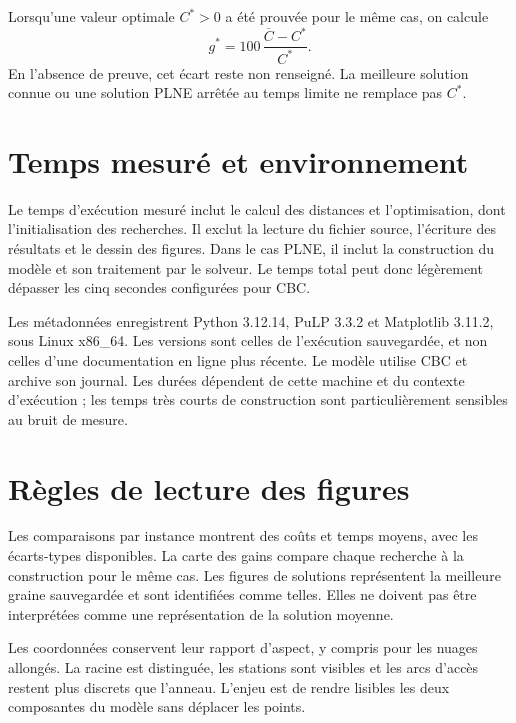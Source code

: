 Lorsqu'une valeur optimale $C^*>0$ a été prouvée pour le même cas, on calcule
\begin{equation}
g^*=100\,\frac{\overline C-C^*}{C^*}.
\end{equation}
En l'absence de preuve, cet écart reste non renseigné. La meilleure solution
connue ou une solution PLNE arrêtée au temps limite ne remplace pas $C^*$.

\section{Temps mesuré et environnement}
Le temps d'exécution mesuré inclut le calcul des distances et l'optimisation,
dont l'initialisation des recherches. Il exclut la lecture du fichier source,
l'écriture des résultats et le dessin des figures. Dans le cas PLNE, il inclut
la construction du modèle et son traitement par le solveur. Le temps total
peut donc légèrement dépasser les cinq secondes configurées pour CBC.

Les métadonnées enregistrent Python 3.12.14, PuLP 3.3.2 et Matplotlib 3.11.2,
sous Linux x86\_64. Les versions sont celles de l'exécution sauvegardée, et non
celles d'une documentation en ligne plus récente. Le modèle utilise CBC et
archive son journal. Les durées dépendent de cette machine et du contexte
d'exécution ; les temps très courts de construction sont particulièrement
sensibles au bruit de mesure.

\section{Règles de lecture des figures}
Les comparaisons par instance montrent des coûts et temps moyens, avec les
écarts-types disponibles. La carte des gains compare chaque recherche à la
construction pour le même cas. Les figures de solutions représentent la
meilleure graine sauvegardée et sont identifiées comme telles. Elles ne doivent
pas être interprétées comme une représentation de la solution moyenne.

Les coordonnées conservent leur rapport d'aspect, y compris pour les nuages
allongés. La racine est distinguée, les stations sont visibles et les arcs
d'accès restent plus discrets que l'anneau. L'enjeu est de rendre lisibles
les deux composantes du modèle sans déplacer les points.
